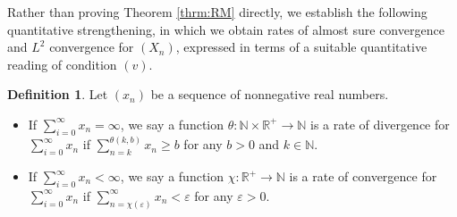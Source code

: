 \documentclass[12pt]{amsart}
\theoremstyle{definition}
\newtheorem{definition}[theorem]{Definition}
\theoremstyle{remark}
\newcommand{\NN}{\mathbb{N}}
\newcommand{\RR}{\mathbb{R}}
\begin{document}
Rather than proving Theorem \ref{thrm:RM} directly, we establish the following quantitative strengthening, in which we obtain rates of almost sure convergence and $L^2$ convergence for $(X_n)$, expressed in terms of a suitable quantitative reading of condition $(v)$.
\begin{definition}
    Let $(x_n)$ be a sequence of nonnegative real numbers.
    \begin{itemize}
        \item If $\sum_{i=0}^\infty x_n = \infty$, we say a function $\theta: \NN \times \RR^+ \to \NN$ is a rate of divergence for $\sum_{i=0}^\infty x_n$ if $\sum_{n=k}^{\theta(k,b)}x_n\geq b$ for any $b>0$ and $k \in \NN$.
        
        \item If $\sum_{i=0}^\infty x_n <  \infty$, we say a function $\chi: \RR^+ \to \NN $ is a rate of convergence for $\sum_{i=0}^\infty x_n$ if $\sum_{n=\chi(\varepsilon)}^{\infty}x_n < \varepsilon$ for any $\varepsilon>0$.
    \end{itemize}
\end{definition}
\end{document}
